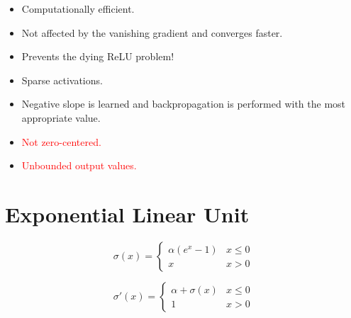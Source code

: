 \documentclass{article}
\begin{document}
\begin{itemize}
  \item Computationally efficient.
  \item Not affected by the vanishing gradient and converges faster.
  \item Prevents the dying ReLU problem!
  \item Sparse activations.
  \item Negative slope is learned and backpropagation is performed with the most appropriate value.
  \item \textcolor{red}{Not zero-centered.}
  \item \textcolor{red}{Unbounded output values.}
\end{itemize}

\clearpage

\section{Exponential Linear Unit}

\begin{figure}[!htb]
  \centering
\end{figure}

\begin{equation}
  \sigma(x) =
    \begin{cases}
      \alpha(e^x - 1) & x \leq 0\\
      x & x > 0
    \end{cases}
\end{equation}

\begin{equation}
  \sigma'(x) =
    \begin{cases}
      \alpha + \sigma(x) & x \leq 0\\
      1 & x > 0
    \end{cases}
\end{equation}
\end{document}
